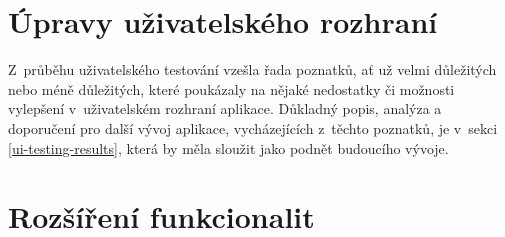\section{Úpravy uživatelského rozhraní}

Z~průběhu uživatelského testování vzešla řada poznatků, ať už velmi důležitých nebo méně důležitých, které poukázaly na nějaké nedostatky či možnosti vylepšení v~uživatelském rozhraní aplikace. Důkladný popis, analýza a doporučení pro další vývoj aplikace, vycházejících z~těchto poznatků, je v~sekci \ref{ui-testing-results}, která by měla sloužit jako podnět budoucího vývoje.

\section{Rozšíření funkcionalit}

